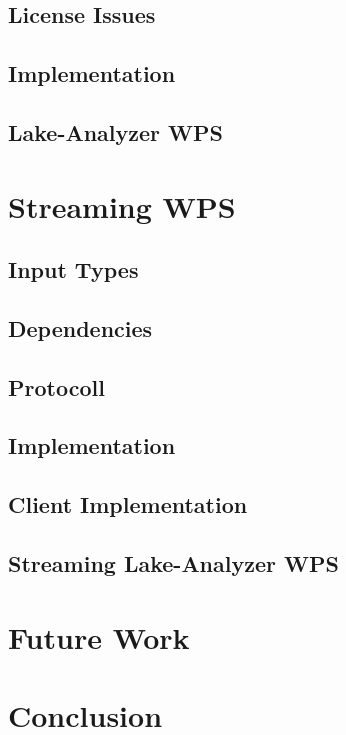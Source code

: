 		\subsection{License Issues}
		\subsection{Implementation}
		\subsection{Lake-Analyzer WPS}
	\section{Streaming WPS}
		\subsection{Input Types}
		\subsection{Dependencies}
		\subsection{Protocoll}
		\subsection{Implementation}
		\subsection{Client Implementation}
		\subsection{Streaming Lake-Analyzer WPS}
	\section{Future Work}
	\section{Conclusion}